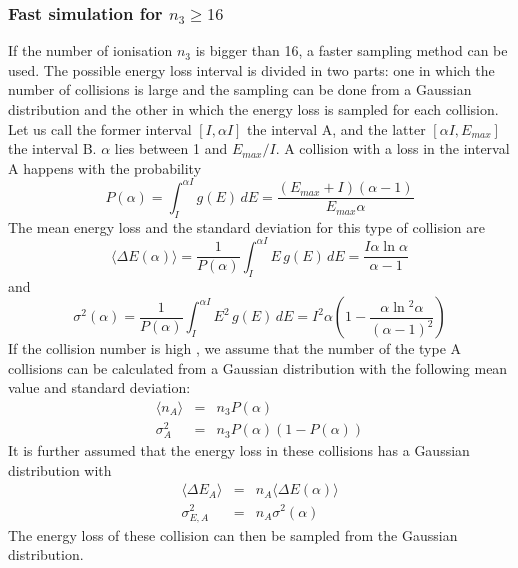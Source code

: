 \subsubsection{Fast simulation for $n_3 \geq 16$}
If the number of ionisation $n_3$ is bigger than 16, a faster sampling
method can be used. The possible energy loss interval is divided
in two parts: one in which the number of collisions is large and
the sampling can be done from a Gaussian distribution and the other
in which the energy loss is sampled for each collision.
Let us call the former interval $[I, \alpha I]$ the interval A,
and the latter $[\alpha I,E_{max}]$ the interval B.
$\alpha$ lies between 1 and $E_{max}/I$.
A collision with a loss in the interval A happens with the probability
\begin{equation}
\label{eq:phys332-5}
P(\alpha) = \int_I^{\alpha I} g(\!E\!) \, dE =
            \frac {( E_{max} + I) (\alpha - 1)}{E_{max} \alpha}
\end{equation}
The mean energy loss and the standard deviation for this type
of collision are
\begin{equation}
\langle \Delta E(\alpha) \rangle = \frac{1}{P(\alpha)} 
        \int_I^{\alpha I} E \, g(\!E\!) \, dE =
        \frac{I \alpha \ln \alpha}{\alpha - 1}
\end{equation}
and
\begin{equation}
\sigma^2(\alpha) = \frac{1}{P(\alpha)}
        \int_I^{\alpha I} E^2 \, g(\!E\!) \, dE =
        I^2 \alpha \left( 1 - \frac{\alpha \ln \! ^2 \alpha}{(\alpha - 1)^2} \right)
\end{equation}
If the collision number is high , we assume that the number of the
type A collisions can be calculated from a Gaussian distribution
with the following mean value and standard deviation:
\begin{eqnarray}
\label{eq:phys332-1}
\langle n_A \rangle & = & n_3 P(\alpha) \\
\label{eq:phys332-2}
\sigma_A^2     & = & n_3 P(\alpha) ( 1 - P(\alpha))
\end{eqnarray}
It is further assumed that the energy loss in these collisions
has a Gaussian distribution with
\begin{eqnarray}
\label{eq:phys332-3}
\langle \Delta E_A \rangle & = & n_A  \langle \Delta E(\alpha) \rangle \\
\label{eq:phys332-4}
\sigma_{E,A}^2             & = & n_A \sigma^2(\alpha)
\end{eqnarray}
The energy loss of these collision can then be sampled
from the Gaussian distribution.

